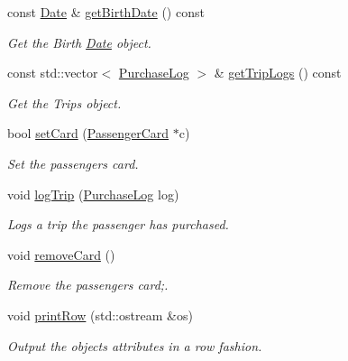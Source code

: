 \begin{DoxyCompactItemize}
const \mbox{\hyperlink{classDate}{Date}} \& \mbox{\hyperlink{classPassenger_aa2101584d2f0daf83ef58e0491754395}{get\+Birth\+Date}} () const
\begin{DoxyCompactList}\small\item\em Get the Birth \mbox{\hyperlink{classDate}{Date}} object. \end{DoxyCompactList}\item 
const std\+::vector$<$ \mbox{\hyperlink{classPurchaseLog}{Purchase\+Log}} $>$ \& \mbox{\hyperlink{classPassenger_a4d8911ca0e8fe1d9226594674bd04af4}{get\+Trip\+Logs}} () const
\begin{DoxyCompactList}\small\item\em Get the Trips object. \end{DoxyCompactList}\item 
bool \mbox{\hyperlink{classPassenger_a09fa79cfc599fa16f54fc34db0b56ea4}{set\+Card}} (\mbox{\hyperlink{classPassengerCard}{Passenger\+Card}} $\ast$c)
\begin{DoxyCompactList}\small\item\em Set the passenger\textquotesingle{}s card. \end{DoxyCompactList}\item 
void \mbox{\hyperlink{classPassenger_ad61aeee59fcdb0084a6cc12d16305d12}{log\+Trip}} (\mbox{\hyperlink{classPurchaseLog}{Purchase\+Log}} log)
\begin{DoxyCompactList}\small\item\em Logs a trip the passenger has purchased. \end{DoxyCompactList}\item 
\mbox{\label{classPassenger_a7afe05c6e57aa998954b878a5b632dac}} 
void \mbox{\hyperlink{classPassenger_a7afe05c6e57aa998954b878a5b632dac}{remove\+Card}} ()
\begin{DoxyCompactList}\small\item\em Remove the passenger\textquotesingle{}s card;. \end{DoxyCompactList}\item 
void \mbox{\hyperlink{classPassenger_a72e4042544557a3dd9c02198aa2582d8}{print\+Row}} (std\+::ostream \&os)
\begin{DoxyCompactList}\small\item\em Output the object\textquotesingle{}s attributes in a row fashion. \end{DoxyCompactList}\end{DoxyCompactItemize}
